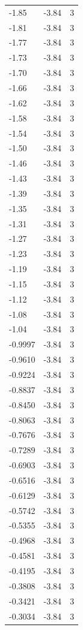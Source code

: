 \begin{longtable}{lrr}
  -1.85 & -3.84 & 3 \\
  -1.81 & -3.84 & 3 \\
  -1.77 & -3.84 & 3 \\
  -1.73 & -3.84 & 3 \\
  -1.70 & -3.84 & 3 \\
  -1.66 & -3.84 & 3 \\
  -1.62 & -3.84 & 3 \\
  -1.58 & -3.84 & 3 \\
  -1.54 & -3.84 & 3 \\
  -1.50 & -3.84 & 3 \\
  -1.46 & -3.84 & 3 \\
  -1.43 & -3.84 & 3 \\
  -1.39 & -3.84 & 3 \\
  -1.35 & -3.84 & 3 \\
  -1.31 & -3.84 & 3 \\
  -1.27 & -3.84 & 3 \\
  -1.23 & -3.84 & 3 \\
  -1.19 & -3.84 & 3 \\
  -1.15 & -3.84 & 3 \\
  -1.12 & -3.84 & 3 \\
  -1.08 & -3.84 & 3 \\
  -1.04 & -3.84 & 3 \\
  -0.9997 & -3.84 & 3 \\
  -0.9610 & -3.84 & 3 \\
  -0.9224 & -3.84 & 3 \\
  -0.8837 & -3.84 & 3 \\
  -0.8450 & -3.84 & 3 \\
  -0.8063 & -3.84 & 3 \\
  -0.7676 & -3.84 & 3 \\
  -0.7289 & -3.84 & 3 \\
  -0.6903 & -3.84 & 3 \\
  -0.6516 & -3.84 & 3 \\
  -0.6129 & -3.84 & 3 \\
  -0.5742 & -3.84 & 3 \\
  -0.5355 & -3.84 & 3 \\
  -0.4968 & -3.84 & 3 \\
  -0.4581 & -3.84 & 3 \\
  -0.4195 & -3.84 & 3 \\
  -0.3808 & -3.84 & 3 \\
  -0.3421 & -3.84 & 3 \\
  -0.3034 & -3.84 & 3 \\

\end{longtable}
